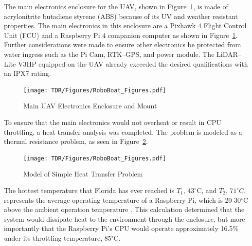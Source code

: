 \documentclass[letterpaper, 12 pt, conference]{ieeeconf}
\begin{document}
The main electronics enclosure for the UAV, shown in Figure~\ref{fig:MainElct}, is made of acrylonitrite butadiene styrene (ABS) because of its UV and weather resistant properties. The main electronics in this enclosure are a Pixhawk 4 Flight Control Unit (FCU) and a Raspberry Pi 4 companion computer as shown in Figure~\ref{fig:MainElct}. Further considerations were made to ensure other electronics be protected from water ingress such as the Pi Cam, RTK--GPS, and power module. The LiDAR--Lite V3HP equipped on the UAV already exceeded the desired qualifications with an IPX7 rating.
% 
\begin{figure}[tb]
\centering
\texttt{[image: TDR/Figures/RoboBoat\_Figures.pdf]}
\caption{Main UAV Electronics Enclosure and Mount}
\label{fig:MainElct}
\end{figure}
% 
To ensure that the main electronics would not overheat or result in CPU throttling, a heat transfer analysis was completed. The problem is modeled as a thermal resistance problem, as seen in Figure~\ref{fig:HeatTransfer}.
% 
\begin{figure}[tb]
\centering
\texttt{[image: TDR/Figures/RoboBoat\_Figures.pdf]}
\caption{Model of Simple Heat Transfer Problem}
\label{fig:HeatTransfer}
\end{figure}
%
The hottest temperature that Florida has ever reached is $T_{1}$, $43^{\circ}$C, and $T_{2}$, $71^{\circ}C$, represents the average operating temperature of a Raspberry Pi, which is 20-30$^{\circ}$C above the ambient operation temperature \cite{FloridaHot,PiHOT}. This calculation determined that the system would dissipate heat to the environment through the enclosure, but more importantly that the Raspberry Pi's CPU would operate approximately 16.5\% under its throttling temperature, 85$^{\circ}$C. 


\end{document}
